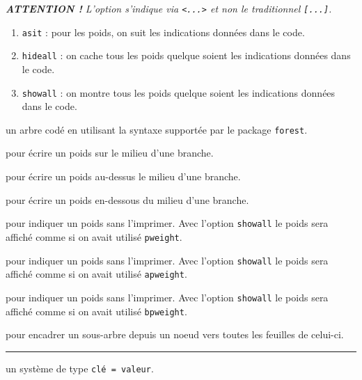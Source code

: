 \documentclass[12pt,a4paper]{article}
\theoremstyle{definition}
\newcommand\separation{
    \medskip
    \hfill\rule{0.5\textwidth}{0.75pt}\hfill
    \medskip
}
\newcommand\extraspace{
    \vspace{0.25em}
}
\begin{document}
\smallskip

\phantom{\IDoption{}}\emph{\textbf{ATTENTION !} L'option s'indique via \texttt{<...>} et non le traditionnel \texttt{[...]}.}

\begin{enumerate}
    \item \verb#asit# : pour les poids, on suit les indications données dans le code.

    \item \verb#hideall# : on cache tous les poids quelque soient les indications données dans le code.

    \item \verb#showall# : on montre tous les poids quelque soient les indications données dans le code.
\end{enumerate}

\Content{} un arbre codé en utilisant la syntaxe supportée par le package \verb#forest#.

\extraspace

  pour écrire un poids sur le milieu d'une branche.

 pour écrire un poids au-dessus le milieu d'une branche.

 pour écrire un poids en-dessous du milieu d'une branche.

\extraspace

 pour indiquer un poids sans l'imprimer.
Avec l'option \verb#showall# le poids sera affiché comme si on avait utilisé \verb#pweight#.

 pour indiquer un poids sans l'imprimer.
Avec l'option \verb#showall# le poids sera affiché comme si on avait utilisé \verb#apweight#.

 pour indiquer un poids sans l'imprimer.
Avec l'option \verb#showall# le poids sera affiché comme si on avait utilisé \verb#bpweight#.

\extraspace

 pour encadrer un sous-arbre depuis un noeud vers toutes les feuilles de celui-ci.





\separation




\IDoption{} un système de type \texttt{clé = valeur}.
\end{document}
